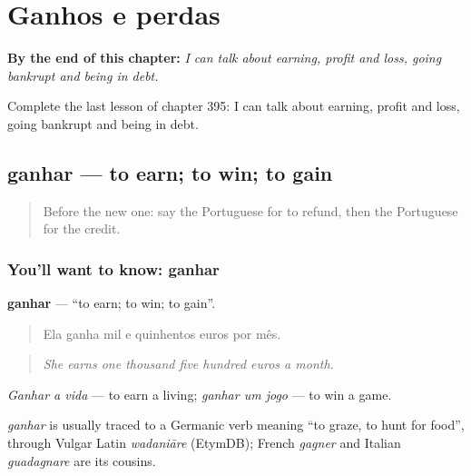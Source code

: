 
\chapter{Ganhos e perdas}
\label{ch:pt-ganhos-e-perdas}

\begin{chapteropening}
\textbf{By the end of this chapter:} \emph{I can talk about earning, profit and loss, going bankrupt and being in debt.}

Complete the last lesson of chapter 395: I can talk about earning, profit and loss, going bankrupt and being in debt.
\end{chapteropening}

\section[ganhar]{ganhar — to earn; to win; to gain}

\label{lesson:PT-C395-ganhar}



\begin{quote}
Before the new one: say the Portuguese for to refund, then the Portuguese for the credit.
\end{quote}

\subsection*{You'll want to know: ganhar}
\textbf{ganhar} — \textquotedblleft{}to earn; to win; to gain\textquotedblright{}.

\begin{quote}
Ela ganha mil e quinhentos euros por mês.
\end{quote}

\begin{quote}
\emph{She earns one thousand five hundred euros a month.}
\end{quote}

\emph{Ganhar a vida} — to earn a living; \emph{ganhar um jogo} — to win a game.

\begin{cousinweb}
\emph{ganhar} is usually traced to a Germanic verb meaning \textquotedblleft{}to graze, to hunt for food\textquotedblright{}, through Vulgar Latin \emph{wadaniāre} (EtymDB); French \emph{gagner} and Italian \emph{guadagnare} are its cousins.
\end{cousinweb}

